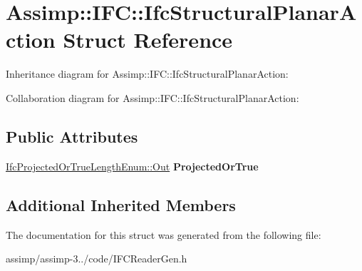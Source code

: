 \hypertarget{struct_assimp_1_1_i_f_c_1_1_ifc_structural_planar_action}{\section{Assimp\+:\+:I\+F\+C\+:\+:Ifc\+Structural\+Planar\+Action Struct Reference}
\label{struct_assimp_1_1_i_f_c_1_1_ifc_structural_planar_action}
}


Inheritance diagram for Assimp\+:\+:I\+F\+C\+:\+:Ifc\+Structural\+Planar\+Action\+:


Collaboration diagram for Assimp\+:\+:I\+F\+C\+:\+:Ifc\+Structural\+Planar\+Action\+:
\subsection*{Public Attributes}
\begin{DoxyCompactItemize}
\item 
\hypertarget{struct_assimp_1_1_i_f_c_1_1_ifc_structural_planar_action_a3cb31170ddc5b3c62c538570e57a7f9f}{\hyperlink{classboost_1_1shared__ptr}{Ifc\+Projected\+Or\+True\+Length\+Enum\+::\+Out} {\bfseries Projected\+Or\+True}}\label{struct_assimp_1_1_i_f_c_1_1_ifc_structural_planar_action_a3cb31170ddc5b3c62c538570e57a7f9f}

\end{DoxyCompactItemize}
\subsection*{Additional Inherited Members}


The documentation for this struct was generated from the following file\+:\begin{DoxyCompactItemize}
\item 
assimp/assimp-\/3../code/I\+F\+C\+Reader\+Gen.\+h\end{DoxyCompactItemize}
